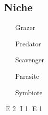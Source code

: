 \subsection{Niche}

	\begin{itemize}		
		\item[Grazer]
		\item[Predator ]
		\item[Scavenger]
		\item[Parasite]
		\item[Symbiote]
	\end{itemize}


E 2
I 1
E 1
